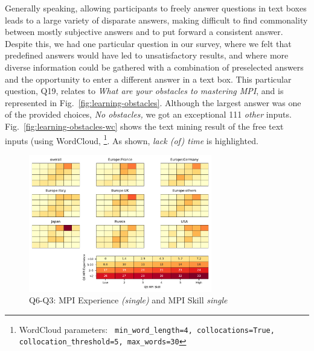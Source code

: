 \documentclass[preprint,5p,times]{elsarticle}
\def\myquote#1{{\it #1}}
\newcommand{\revision}[2]{{\color{blue}#2}}
\begin{document}
Generally speaking, allowing participants to freely answer questions in text
boxes \revision{lead}{leads} to a large variety of disparate answers, making difficult to find
commonality between mostly subjective answers and to put forward a consistent
answer. Despite this, we had one particular question in our survey, where we
felt that predefined answers would have \revision{been}{} led to unsatisfactory results, and
where more diverse information could be gathered with a combination of
preselected answers and the opportunity to enter a different answer in a text
box. This particular question, Q19, relates to \myquote{What are your obstacles
to mastering MPI}, and is represented in Fig.~\ref{fig:learning-obstacles}.
Although the largest answer was one of the provided choices, \myquote{No
obstacles,} we got an exceptional 111 \myquote{other} inputs.
\revision{
After post-analysis, we can report that out of these, 
more than 20 participants, 18\%, answered pinpointing
to how time consuming mastering MPI is. Many other
participants pointed out the need for more clear MPI programming guideline
(\myquote{clear doc.}, \myquote{internal doc.}, \myquote{implementation doc.},
\myquote{performance guideline}, and so on, in their words). Some participants
\revision{complaints}{complaint} about MPI implementations and the (performance or specification)
differences among implementations.}
{
  Fig.~\ref{fig:learning-obstacles-wc} shows the text mining result of
  the free text inputs (using WordCloud\cite{wordcloud}, \footnote{WordCloud parameters: \tt
    min\_word\_length=4, collocations=True,
    collocation\_threshold=5,
    max\_words=30}. As shown, \myquote{lack
  (of) time} is highlighted.
}

\begin{figure}[tb]
\begin{center}
\includegraphics[width=8.0cm]{Figs/Q6-Q3.pdf}
\caption{Q6-Q3: MPI Experience {\it(single)} and MPI Skill {\it single}}
\label{fig:experience-and-skill}
\end{center}
\end{figure}
\end{document}
